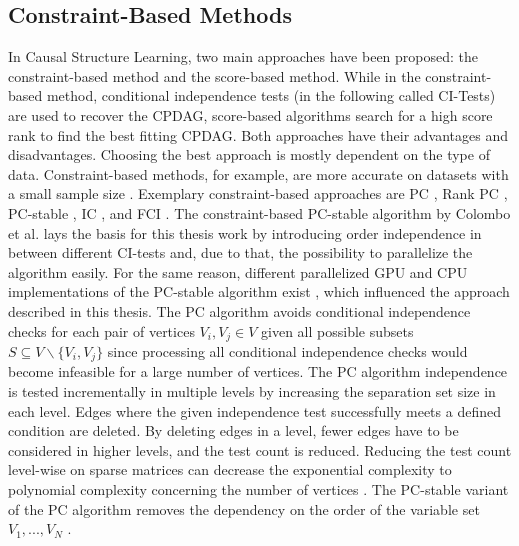 \subsection{Constraint-Based Methods}
In Causal Structure Learning, two main approaches have been proposed: the constraint-based method and the score-based method. While in the constraint-based method, conditional independence tests (in the following called CI-Tests) are used to recover the CPDAG, score-based algorithms search for a high score rank to find the best fitting CPDAG. Both approaches have their advantages and disadvantages. Choosing the best approach is mostly dependent on the type of data. Constraint-based methods, for example, are more accurate on datasets with a small sample size \cite{scutariBayesianNetworkConstraintBased2017}. Exemplary constraint-based approaches are PC \cite{spirtesCausationPredictionSearch1993}, Rank PC \cite{harrisPCAlgorithmNonparanormal2013}, PC-stable \cite{colomboOrderIndependentConstraintBasedCausal2014}, IC \cite{vermaEquivalenceSynthesisCausal1990}, and FCI \cite{spirtesCausationPredictionSearch1993}.
The constraint-based PC-stable algorithm by Colombo et al. \cite{colomboOrderIndependentConstraintBasedCausal2014} lays the basis for this thesis work by introducing order independence in between different CI-tests and, due to that, the possibility to parallelize the algorithm easily. For the same reason, different parallelized GPU and CPU implementations of the PC-stable algorithm exist \cite{schmidtLoadBalancedParallelConstraintBased2019,schmidtOrderIndependentConstraintBasedCausal2018,zarebavaniCuPCCUDAbasedParallel2018}, which influenced the approach described in this thesis.
The PC algorithm avoids conditional independence checks for each pair of vertices $V_i, V_j \in V$ given all possible subsets $S \subseteq V \backslash \{V_i, V_j\}$ \cite{pearlTheoryInferredCausation1995} since processing all conditional independence checks would become infeasible for a large number of vertices. The PC algorithm independence is tested incrementally in multiple levels by increasing the separation set size in each level. Edges where the given independence test successfully meets a defined condition are deleted. By deleting edges in a level, fewer edges have to be considered in higher levels, and the test count is reduced. Reducing the test count level-wise on sparse matrices can decrease the exponential complexity to polynomial complexity concerning the number of vertices \cite{kalischEstimatingHighDimensionalDirected2007}.
The PC-stable variant of the PC algorithm removes the dependency on the order of the variable set $V_1, ...,V_N$ \cite{colomboOrderIndependentConstraintBasedCausal2014,schmidtOrderIndependentConstraintBasedCausal2018}.

